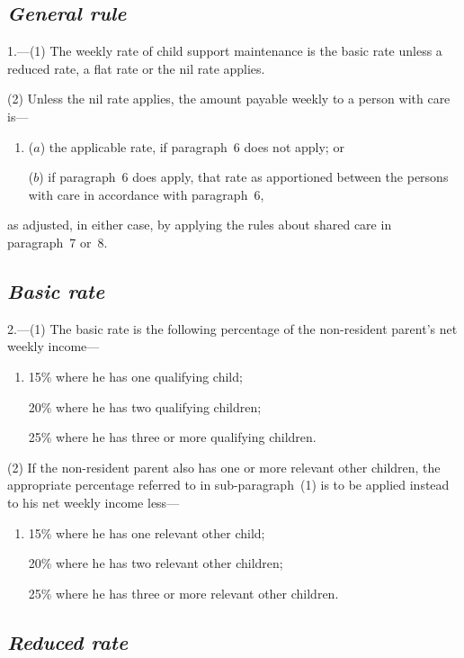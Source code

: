 \documentclass[12pt,a4paper]{article}
\begin{document}
\subsection*{\itshape General rule}

1.---(1) The weekly rate of child support maintenance is the basic rate unless a reduced rate, a flat rate or the nil rate applies.

(2) Unless the nil rate applies, the amount payable weekly to a person with care is—
\begin{enumerate}\item[]
($a$) the applicable rate, if paragraph~6 does not apply; or

($b$) if paragraph~6 does apply, that rate as apportioned between the persons with care in accordance with paragraph~6,
\end{enumerate}
as adjusted, in either case, by applying the rules about shared care in paragraph~7 or~8. 

\subsection*{\itshape Basic rate}

2.---(1) The basic rate is the following percentage of the non-resident parent’s net weekly income—
\begin{enumerate}\item[]
    15\% where he has one qualifying child;

    20\% where he has two qualifying children;

    25\% where he has three or more qualifying children. 
\end{enumerate}

(2) If the non-resident parent also has one or more relevant other children, the appropriate percentage referred to in sub-paragraph~(1)  is to be applied instead to his net weekly income less—
\begin{enumerate}\item[]
    15\% where he has one relevant other child;

    20\% where he has two relevant other children;

    25\% where he has three or more relevant other children. 
\end{enumerate}

\subsection*{\itshape Reduced rate}
\end{document}
